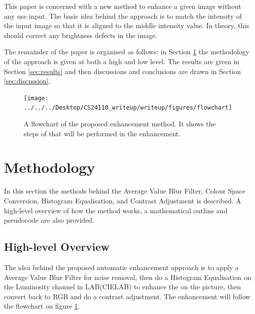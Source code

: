 \documentclass[journal,transmag]{IEEEtran}
\begin{document}
This paper is concerned with a new method to enhance a given image without any use input.  The basic idea behind the approach is to match the intensity of the input image so that it is aligned to the middle intensity value.  In theory, this should correct any brightness defects in the image.

The remainder of the paper is organised as follows: in Section \ref{sec:methods} the methodology of the approach is given at both a high and low level.  The results are given in Section \ref{sec:results} and then discussions and conclusions are drawn in Section \ref{sec:discussion}.

\begin{figure}[h]
\centering
\texttt{[image: ../../../Desktop/CS24110\_writeup/writeup/figures/flowchart]}
\caption{A flowchart of the proposed enhancement method. It shows the steps of that will be performed in the enhancement.}
\label{fig:flowchart}
\end{figure}

\section{Methodology}
\label{sec:methods}

In this section the methods behind the Average Value Blur Filter, Colour Space Conversion, Histogram Equalisation, and Contrast Adjustment is described. A high-level overview of how the method works, a mathematical outline and pseudocode are also provided.

\subsection{High-level Overview}
The idea behind the proposed automatic enhancement approach is to apply a Average Value Blur Filter for noise removal, then do a Histogram Equalisation on the Luminosity channel in LAB(CIELAB) to enhance the on the picture, then convert back to RGB and do a contrast adjustment. The enhancement will follow the flowchart on figure \ref{fig:flowchart}.

\end{document}
